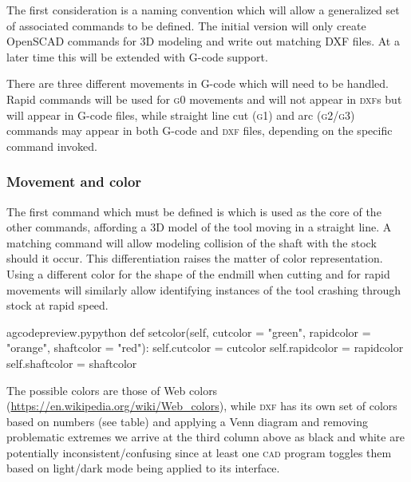 \documentclass{ltxdoc}
\begin{document}
The first consideration is a naming convention which will allow a generalized set of associated commands to be defined. The initial version will only create OpenSCAD commands for 3D modeling and write out matching DXF files. At a later time this will be extended with G-code support.

There are three different movements in G-code which will need to be handled. Rapid commands will be used for \textsc{g0} movements and will not appear in \textsc{dxf}s but will appear in G-code files, while straight line cut (\textsc{g1}) and arc (\textsc{g2/g3}) commands may appear in both G-code and \textsc{dxf} files, depending on the specific command invoked. 

\subsubsection{Movement and color}

The first command which must be defined is  which is used as the core of the other commands, affording a 3D model of the tool moving in a straight line. A matching  command will allow modeling collision of the shaft with the stock should it occur. This differentiation raises the matter of color representation. Using a different color for the shape of the endmill when cutting and for rapid movements will similarly allow identifying instances of the tool crashing through stock at rapid speed.

\lstset{firstnumber=\thegcpy}
\begin{writecode}{a}{gcodepreview.py}{python}
    def setcolor(self, 
                  cutcolor = "green",
                  rapidcolor = "orange",
                  shaftcolor = "red"):
        self.cutcolor = cutcolor
        self.rapidcolor = rapidcolor
        self.shaftcolor = shaftcolor

\end{writecode}
\addtocounter{gcpy}{23}

The possible colors are those of Web colors (\url{https://en.wikipedia.org/wiki/Web_colors}), while \textsc{dxf} has its own set of colors based on numbers (see table) and applying a Venn diagram and removing problematic extremes we arrive at the third column above as black and white are potentially inconsistent/confusing since at least one \textsc{cad} program toggles them based on light/dark mode being applied to its interface.
\end{document}

